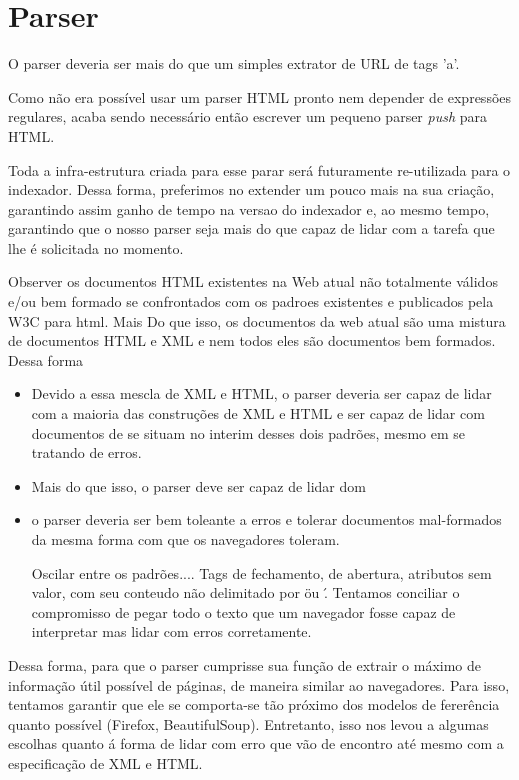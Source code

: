

\section{Parser}

O parser deveria ser mais do que um simples extrator de URL de tags 'a'.

Como não era possível usar um parser HTML pronto nem depender de expressões regulares, acaba sendo necessário então escrever um pequeno parser \emph{push} para HTML.

Toda a infra-estrutura criada para esse parar será futuramente re-utilizada para o indexador. Dessa forma, preferimos no extender um pouco mais na sua criação, garantindo assim ganho de tempo na versao do indexador e, ao mesmo tempo, garantindo que o nosso parser seja mais do que capaz de lidar com a tarefa que lhe é solicitada no momento.

Observer os documentos HTML existentes na Web atual não totalmente válidos e/ou bem formado se confrontados com os padroes existentes e publicados pela W3C para html. Mais Do que isso, os documentos da web atual são uma mistura de documentos HTML e XML e nem todos eles são documentos bem formados. Dessa forma
\begin{itemize}
\item Devido a essa mescla de XML e HTML, o parser deveria ser capaz de lidar com a maioria das construções de XML e HTML e ser capaz de lidar com documentos de se situam no interim desses dois padrões, mesmo em se tratando de erros.

\item Mais do que isso, o parser deve ser capaz de lidar dom

\item o parser deveria ser bem toleante a erros e tolerar documentos mal-formados da mesma forma com que os navegadores toleram. 

Oscilar entre os padrões.... Tags de fechamento, de abertura, atributos sem
valor, com seu conteudo não delimitado por \" ou \'. Tentamos conciliar o
compromisso de pegar todo o texto que um navegador fosse capaz de interpretar
mas lidar com erros corretamente.

\end{itemize}

Dessa forma, para que o parser cumprisse sua função de extrair o máximo de informação útil possível de páginas, de maneira similar ao navegadores. Para isso, tentamos garantir que ele se comporta-se tão próximo dos modelos de fererência quanto possível (Firefox, BeautifulSoup). Entretanto, isso nos levou a algumas escolhas quanto á forma de lidar com erro que vão de encontro até mesmo com a especificação de XML e HTML.

